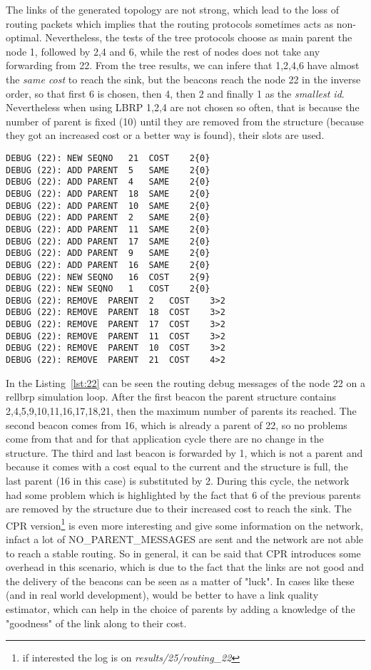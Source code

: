 \documentclass{article}
\begin{document}
The links of the generated topology are not strong, which lead to the loss of routing packets which implies that the routing protocols sometimes acts as non-optimal. Nevertheless, the tests of the tree protocols choose as main parent the node 1, followed by 2,4 and 6, while the rest of nodes does not take any forwarding from 22. From the tree results, we can infere that 1,2,4,6 have almost the \textit{same cost} to reach the sink, but the beacons reach the node 22 in the inverse order, so that first 6 is chosen, then 4, then 2 and finally 1 as the \textit{smallest id}. Nevertheless when using LBRP 1,2,4 are not chosen so often, that is because the number of parent is fixed (10) until they are removed from the structure (because they got an increased cost or a better way is found), their slots are used.
\begin{lstlisting}[caption=Routing debug messages of node 22 with rellbrp,label=lst:22]
DEBUG (22): NEW	SEQNO	21	COST	2{0}
DEBUG (22): ADD	PARENT	5	SAME	2{0}
DEBUG (22): ADD	PARENT	4	SAME	2{0}
DEBUG (22): ADD	PARENT	18	SAME	2{0}
DEBUG (22): ADD	PARENT	10	SAME	2{0}
DEBUG (22): ADD	PARENT	2	SAME	2{0}
DEBUG (22): ADD	PARENT	11	SAME	2{0}
DEBUG (22): ADD	PARENT	17	SAME	2{0}
DEBUG (22): ADD	PARENT	9	SAME	2{0}
DEBUG (22): ADD	PARENT	16	SAME	2{0}
DEBUG (22): NEW	SEQNO	16	COST	2{9}
DEBUG (22): NEW	SEQNO	1	COST	2{0}
DEBUG (22): REMOVE	PARENT	2	COST	3>2
DEBUG (22): REMOVE	PARENT	18	COST	3>2
DEBUG (22): REMOVE	PARENT	17	COST	3>2
DEBUG (22): REMOVE	PARENT	11	COST	3>2
DEBUG (22): REMOVE	PARENT	10	COST	3>2
DEBUG (22): REMOVE	PARENT	21	COST	4>2
\end{lstlisting}
In the Listing~\ref{lst:22} can be seen the routing debug messages of the node 22 on a rellbrp simulation loop. After the first beacon the parent structure contains {2,4,5,9,10,11,16,17,18,21}, then the maximum number of parents its reached. The second beacon comes from 16, which is already a parent of 22, so no problems come from that and for that application cycle there are no change in the structure. The third and last beacon is forwarded by 1, which is not a parent and because it comes with a cost equal to the current and the structure is full, the last parent (16 in this case) is substituted by 2. During this cycle, the network had some problem which is highlighted by the fact that 6 of the previous parents are removed by the structure due to their increased cost to reach the sink. The CPR version\footnote{if interested the log is on \textit{results/25/routing\_22}} is even more interesting and give some information on the network, infact a lot of NO\_PARENT\_MESSAGES are sent and the network are not able to reach a stable routing. So in general, it can be said that CPR introduces some overhead in this scenario, which is due to the fact that the links are not good and the delivery of the beacons can be seen as a matter of "luck". In cases like these (and in real world development), would be better to have a link quality estimator, which can help in the choice of parents by adding a knowledge of the "goodness" of the link along to their cost.
\end{document}
